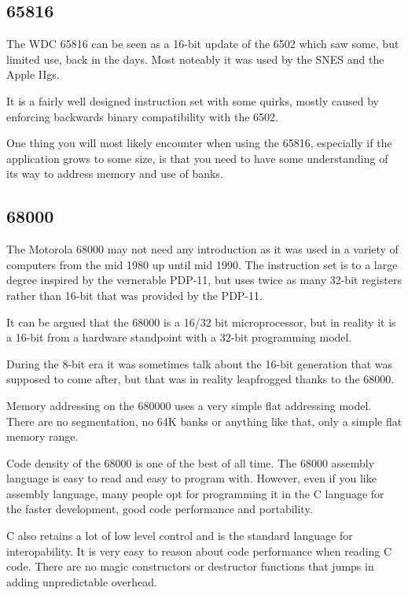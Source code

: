 \subsection*{65816}

The WDC 65816 can be seen as a 16-bit update of the 6502 which saw
some, but limited use, back in the days. Most noteably it was used by
the SNES and the Apple IIgs.

It is a fairly well designed instruction set with some quirks, mostly
caused by enforcing backwards binary compatibility with the 6502.

One thing you will most likely encounter when using the 65816,
especially if the application grows to some size, is that you need to
have some understanding of its way to address memory and use of
banks.


\subsection*{68000}

The Motorola 68000 may not need any introduction as it was used in a
variety of computers from the mid 1980 up until mid 1990. The
instruction set is to a large degree inspired by the vernerable
PDP-11, but uses twice as many 32-bit registers rather than 16-bit that
was provided by the PDP-11.

It can be argued that the 68000 is a 16/32 bit microprocessor, but in
reality it is a 16-bit from a hardware standpoint with a 32-bit
programming model.

During the 8-bit era it was sometimes talk about the 16-bit generation that
was supposed to come after, but that was in reality leapfrogged thanks
to the 68000.

Memory addressing on the 680000 uses a very simple flat addressing
model. There are no segmentation, no 64K banks or anything like that,
only a simple flat memory range.

Code density of the 68000 is one of the best of all time. The 68000
assembly language is easy to read and easy to program with.
However, even if you like assembly language, many people opt for
programming it in the C language for the faster development, good code
performance and portability.

C also retains a lot of low level control and is the standard language
for interopability. It is very easy to reason about code performance
when reading C code. There are no magic constructors or destructor
functions that jumps in adding unpredictable overhead.

